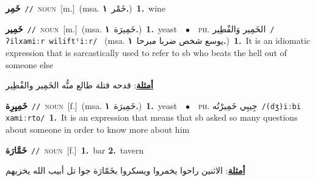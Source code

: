 \documentclass[10pt,a4paper,twoside]{article} %
\begin{document}
\begin{multicols}{2}
{\setlength\topsep{0pt}\textbf{\foreignlanguage{arabic}{خَمِر}}\ {\color{gray}\texttt{//}\color{black}}\ \textsc{noun}\ [m.]\ \color{gray}(msa. \foreignlanguage{arabic}{خَمْر}~\foreignlanguage{arabic}{\textbf{١.}})\color{black}\ \textbf{1.}~wine\ } \vspace{2mm}

{\setlength\topsep{0pt}\textbf{\foreignlanguage{arabic}{خَمِير}}\ {\color{gray}\texttt{//}\color{black}}\ \textsc{noun}\ [m.]\ \color{gray}(msa. \foreignlanguage{arabic}{خَمِيرَة}~\foreignlanguage{arabic}{\textbf{١.}})\color{black}\ \textbf{1.}~yeast\ \ $\bullet$\ \ \textsc{ph.} \color{gray} \foreignlanguage{arabic}{الخَمِير وَالفْطِير}\color{black}\ {\color{gray}\texttt{/{\sffamily ʔilxamiːr wiliftˤiːr}/}\color{black}}\ \color{gray} (msa. \foreignlanguage{arabic}{يوسع شخص ضربا مبرحا}~\foreignlanguage{arabic}{\textbf{١.}})\color{black}\ \textbf{1.}~It is an idiomatic expression that is sarcastically used to refer to sb who beats the hell out of someone else\  \begin{flushright}\color{gray}\foreignlanguage{arabic}{\textbf{\underline{\foreignlanguage{arabic}{أمثلة}}}: قدحه قتلة طالع منُّه الخَمِير والفْطِير}\end{flushright}\color{black}} \vspace{2mm}

{\setlength\topsep{0pt}\textbf{\foreignlanguage{arabic}{خَمِيِرِة}}\ {\color{gray}\texttt{//}\color{black}}\ \textsc{noun}\ [f.]\ \color{gray}(msa. \foreignlanguage{arabic}{خَمِيرَة}~\foreignlanguage{arabic}{\textbf{١.}})\color{black}\ \textbf{1.}~yeast\ \ $\bullet$\ \ \textsc{ph.} \color{gray} \foreignlanguage{arabic}{جِيبِي خَمِيرْتُه}\color{black}\ {\color{gray}\texttt{/{\sffamily (dʒ)iːbi xamiːrto}/}\color{black}}\ \textbf{1.}~It is an expression that means that sb asked so many questions about someone in order to know more about him\ } \vspace{2mm}

{\setlength\topsep{0pt}\textbf{\foreignlanguage{arabic}{خَمَّارَة}}\ {\color{gray}\texttt{//}\color{black}}\ \textsc{noun}\ [f.]\ \textbf{1.}~bar  \textbf{2.}~tavern\  \begin{flushright}\color{gray}\foreignlanguage{arabic}{\textbf{\underline{\foreignlanguage{arabic}{أمثلة}}}: الاثنين راحوا يخمروا ويسكروا بخَمّارَة جوا تل أبيب الله يخزيهم}\end{flushright}\color{black}} \vspace{2mm}


\end{multicols}
\end{document}
